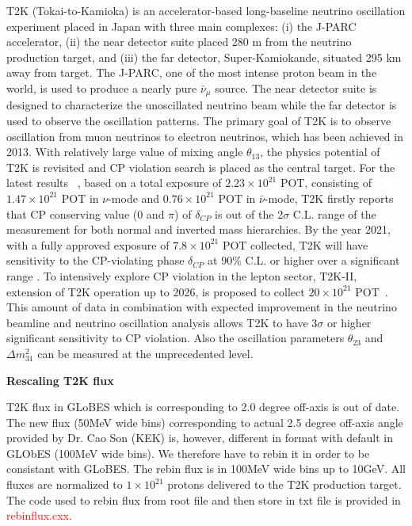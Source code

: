 \documentclass[a4 paper,12pt]{report}%
\begin{document}
 T2K (Tokai-to-Kamioka) \cite{Itow:2001ee} is an accelerator-based long-baseline neutrino oscillation experiment placed in Japan with three main complexes:  (i) the J-PARC accelerator, (ii) the near detector suite placed 280 m from the neutrino production target, and (iii) the far detector, Super-Kamiokande, situated 295 km away from target. The J-PARC, one of the most intense proton beam in the world, is used to produce a nearly pure $\bar{\nu}_{\mu}$ source. The near detector suite is designed to characterize the unoscillated neutrino beam while the far detector is used to observe the oscillation patterns. The primary goal of T2K is to observe oscillation from muon neutrinos to electron neutrinos, which has been achieved in 2013. With relatively large value of mixing angle $\theta_{13}$, the physics potential of T2K is revisited and CP violation search is placed as the central target. For the latest results ~\cite{Cao:201805}, based on a total exposure of $2.23\times 10^{21}$ POT, consisting of $1.47\times10^{21}$ POT in $\nu$-mode and $0.76\times10^{21}$ POT in $\bar{\nu}$-mode, T2K firstly reports that CP conserving value (0 and $\pi$) of $\delta_{CP}$ is out of the 2$\sigma$ C.L. range of the measurement for both normal and inverted mass hierarchies.  By the year 2021, with a fully approved exposure of $7.8 \times 10^{21}$ POT collected, T2K will have sensitivity to the CP-violating phase $\delta_{CP}$ at $90\%$ C.L. or higher over a significant range \cite{Abe:2014tzr}. To intensively explore CP violation in the lepton sector, T2K-II, extension of T2K operation up to 2026, is proposed to collect $20\times 10^{21}$ POT~\cite{Abe:2016tez}. This amount of data in combination with expected improvement in the neutrino beamline and neutrino oscillation analysis allows T2K to have 3$\sigma$ or higher significant sensitivity to CP violation. Also the oscillation parameters $\theta_{23}$ and $\Delta m^2_{31}$ can be measured at the unprecedented level.  \par
\textbf{Rescaling T2K flux}\par 
T2K flux in GLoBES which is corresponding to 2.0 degree off-axis is out of date. The new flux (50MeV wide bins) corresponding to actual 2.5 degree off-axis angle provided by Dr. Cao Son (KEK) is, however, different in format with default in GLObES (100MeV wide bins). We therefore have to rebin it in order to be consistant with GLoBES. The rebin flux is in 100MeV wide bins up to 10GeV. All fluxes are normalized to $1 \times 10^{21}$ protons delivered to the T2K production target. The code used to rebin flux from root file and then store in txt file is provided in \textcolor{red}{rebinflux.cxx}. \par 
\end{document}
